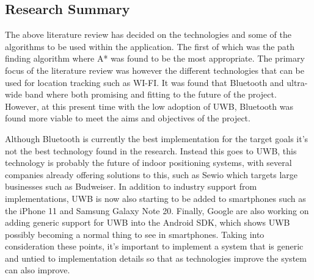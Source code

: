 \subsection{Research Summary}
The above literature review has decided on the technologies and some of the algorithms to be used within the application. The first of which was the path finding algorithm where A* was found to be the most appropriate. The primary focus of the literature review was however the different technologies that can be used for location tracking such as WI-FI. It was found that Bluetooth and ultra-wide band where both promising and fitting to the future of the project. However, at this present time with the low adoption of UWB, Bluetooth was found more viable to meet the aims and objectives of the project.

Although Bluetooth is currently the best implementation for the target goals it’s not the best technology found in the research. Instead this goes to UWB, this technology is probably the future of indoor positioning systems, with several companies already offering solutions to this, such as Sewio which targets large businesses such as Budweiser. In addition to industry support from implementations, UWB is now also starting to be added to smartphones such  as the iPhone 11 and Samsung Galaxy Note 20. Finally, Google are also working on adding generic support for UWB into the Android SDK, which shows UWB possibly becoming a normal thing to see in smartphones. Taking into consideration these points, it’s important to implement a system that is generic and untied to implementation details so that as technologies improve the system can also improve.
